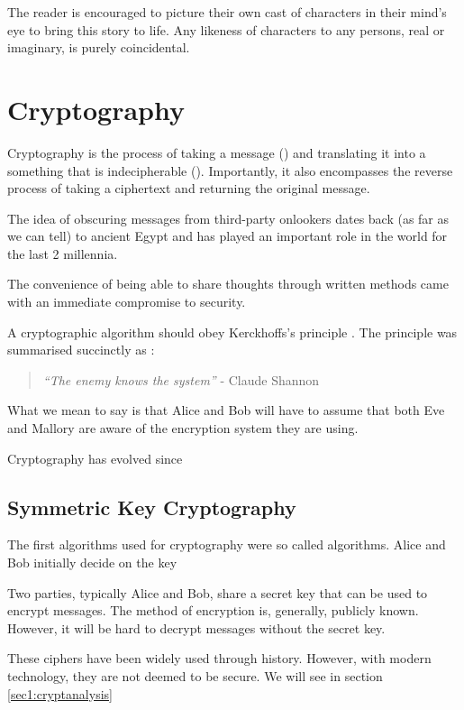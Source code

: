 The reader is encouraged to picture their own cast of characters in their mind's eye to bring this story to life. Any likeness of characters to any persons, real or imaginary, is purely coincidental.

\section{Cryptography}
\label{sec1:crypto}

Cryptography is the process of taking a message () and translating it into a something that is indecipherable (). Importantly, it also encompasses the reverse process of taking a ciphertext and returning the original message. 

The idea of obscuring messages from third-party onlookers dates back (as far as we can tell) to ancient Egypt and has played an important role in the world for the last 2 millennia. 

The convenience of being able to share thoughts through written methods came with an immediate compromise to security.

A cryptographic algorithm should obey Kerckhoffs's principle \cite{KerckhoffsPrincple}. The principle was summarised succinctly as \cite{shannon1949communication}:

\begin{quote}
\centering
\textit{``The enemy knows the system''} - Claude Shannon 
\end{quote}

What we mean to say is that Alice and Bob will have to assume that both Eve and Mallory are aware of the encryption system they are using. 

Cryptography has evolved since  

\subsection{Symmetric Key Cryptography}

The first algorithms used for cryptography were so called  algorithms. Alice and Bob initially decide on the key 

Two parties, typically Alice and Bob, share a secret key that can be used to encrypt messages. The method of encryption is, generally, publicly known. However, it will be hard to decrypt messages without the secret key.

These ciphers have been widely used through history. However, with modern technology, they are not deemed to be secure. We will see in section \ref{sec1:cryptanalysis}

